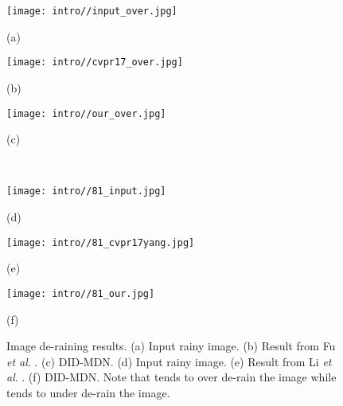 \documentclass[10pt,twocolumn,letterpaper]{article}
\begin{document}
\begin{figure}[t]
	\centering
	\begin{minipage}{.155\textwidth}
		\centering
		\texttt{[image: intro//input\_over.jpg]}
		\captionsetup{labelformat=empty}
		\captionsetup{justification=centering}
		\caption*{(a)}
\end{minipage}
	\begin{minipage}{.155\textwidth}
		\centering
		\texttt{[image: intro//cvpr17\_over.jpg]}
		\captionsetup{labelformat=empty}
		\captionsetup{justification=centering}
		\caption*{(b)}
\end{minipage}
	\begin{minipage}{.155\textwidth}
		\centering
		\texttt{[image: intro//our\_over.jpg]}
		\captionsetup{labelformat=empty}
		\captionsetup{justification=centering}
		\caption*{(c)}
\end{minipage}	\\
	\begin{minipage}{.155\textwidth}
		\centering
		\texttt{[image: intro//81\_input.jpg]}
		\captionsetup{labelformat=empty}
		\captionsetup{justification=centering}
		\caption*{(d)}
\end{minipage}
	\begin{minipage}{.155\textwidth}
		\centering
		\texttt{[image: intro//81\_cvpr17yang.jpg]}
		\captionsetup{labelformat=empty}
		\captionsetup{justification=centering}
		\caption*{(e)}
\end{minipage}
	\begin{minipage}{.155\textwidth}
		\centering
		\texttt{[image: intro//81\_our.jpg]}
		\captionsetup{labelformat=empty}
		\captionsetup{justification=centering}
		\caption*{(f)}
\end{minipage}
	\vskip -8pt\caption{Image de-raining results.  (a) Input rainy image. (b) Result from Fu \emph{et al}. \cite{derain_cvpr2017}. (c) DID-MDN.   (d) Input rainy image. (e) Result from Li \emph{et al}. \cite{derain_cvpr2017_multi}. (f) DID-MDN. Note that \cite{derain_cvpr2017} tends to over de-rain the image while \cite{derain_cvpr2017_multi} tends to under de-rain the image.  
	 \label{fig:motivation}}
\end{figure}
  
\end{document}
